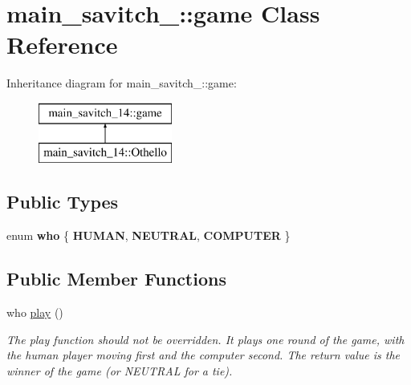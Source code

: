 \hypertarget{classmain__savitch__14_1_1game}{}\section{main\+\_\+savitch\+\_\+:\+:game Class Reference}
\label{classmain__savitch__14_1_1game}
Inheritance diagram for main\+\_\+savitch\+\_\+:\+:game\+:\begin{figure}[H]
\begin{center}
\leavevmode
\includegraphics[height=2.000000cm]{classmain__savitch__14_1_1game}
\end{center}
\end{figure}
\subsection*{Public Types}
\begin{DoxyCompactItemize}
\item 
\mbox{\label{classmain__savitch__14_1_1game_a4fe20fb287f809ae2b68e28e4ccba634}} 
enum {\bfseries who} \{ {\bfseries H\+U\+M\+AN}, 
{\bfseries N\+E\+U\+T\+R\+AL}, 
{\bfseries C\+O\+M\+P\+U\+T\+ER}
 \}
\end{DoxyCompactItemize}
\subsection*{Public Member Functions}
\begin{DoxyCompactItemize}
\item 
who \hyperlink{classmain__savitch__14_1_1game_a4dbeaddb78059f7c5dcbf5cc4e026317}{play} ()
\begin{DoxyCompactList}\small\item\em The play function should not be overridden. It plays one round of the game, with the human player moving first and the computer second. The return value is the winner of the game (or N\+E\+U\+T\+R\+AL for a tie). \end{DoxyCompactList}\end{DoxyCompactItemize}
